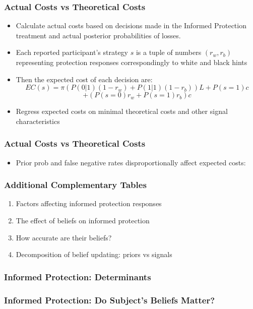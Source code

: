 \documentclass[11pt,hyperref={bookmarks=false}]{beamer}
\begin{document}
\begin{frame}
\frametitle{Actual Costs vs Theoretical Costs}
\begin{itemize}
\item Calculate actual costs based on decisions made in the Informed Protection treatment and actual posterior probabilities of losses.
\item Each reported participant's strategy $s$ is a tuple of numbers $(r_w,r_b)$ representing protection responses correspondingly to white and black hints
\item Then the expected cost of each decision are:
\small
$$EC(s)=\pi (P(0|1)(1-r_w)+P(1|1)(1-r_b))L+P(s=1)c$$
$$+(P(s=0)r_w+P(s=1)r_b)c$$
\normalsize
\item Regress expected costs on minimal theoretical costs and other signal characteristics
\end{itemize}
\end{frame}


\begin{frame}
\frametitle{Actual Costs vs Theoretical Costs}
\begin{itemize}
\item Prior prob and false negative rates disproportionally affect expected costs:
\end{itemize}
\footnotesize

\end{frame}


\begin{frame}
\frametitle{Additional Complementary Tables}
\begin{enumerate}
\item Factors affecting informed protection responses
\item The effect of beliefs on informed protection
\item How accurate are their beliefs?
\item Decomposition of belief updating: priors vs signals
\end{enumerate}
\end{frame}



\begin{frame}
\frametitle{Informed Protection: Determinants}
\footnotesize


\end{frame}


\begin{frame}
\frametitle{Informed Protection: Do Subject's Beliefs Matter?}

\end{frame}
\end{document}
